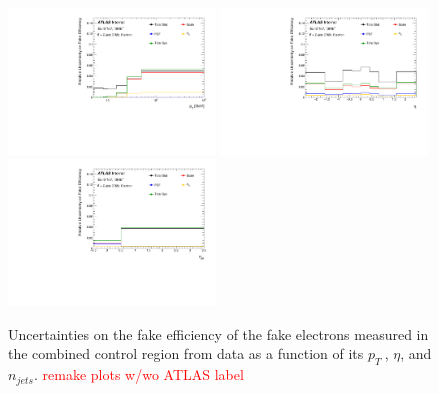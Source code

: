 \begin{figure}[htb]
		\begin{center}
		\includegraphics[width = 0.49\textwidth]{figures/Analysis/Background/SystematicUncertainties3D_Electron_pT.pdf}
		\includegraphics[width = 0.49\textwidth]{figures/Analysis/Background/SystematicUncertainties3D_Electron_eta.pdf}\\
		\includegraphics[width = 0.49\textwidth]{figures/Analysis/Background/SystematicUncertainties3D_Electron_njet.pdf} 
		\end{center}
	\caption{Uncertainties on the fake efficiency of the fake electrons measured in the combined control region from data as a function of its $p_{T}~$, $\eta$, and $n_{jets}$. \textcolor{red}{remake plots w/wo ATLAS label} \label{fig:FakeEffUnc_3D_Electron}}
\end{figure}

